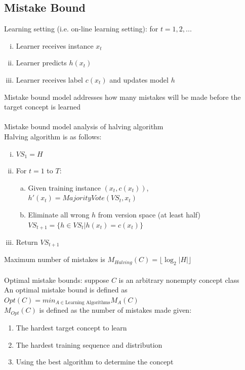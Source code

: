 \documentclass{article}
\begin{document}
		\subsection{Mistake Bound}
			Learning setting (i.e. on-line learning setting): for $t = 1, 2, ...$
			\begin{enumerate}[(i)]
				\item Learner receives instance $x_t$
				\item Learner predicts $h(x_t)$
				\item Learner receives label $c(x_t)$ and updates model $h$
				\end{enumerate}
			Mistake bound model addresses how many mistakes will be made before the target concept is learned \\
			\\
			Mistake bound model analysis of halving algorithm \\
			Halving algorithm is as follows:
			\begin{enumerate}[(i)]
				\item $VS_1 = H$
				\item For $t = 1$ to $T$:
				\begin{enumerate}[(a)]
					\item Given training instance $(x_t, c(x_t))$, $h'(x_t) = MajorityVote(VS_t, x_t)$
					\item Eliminate all wrong $h$ from version space (at least half) \\
					$VS_{t + 1} = \{h \in VS_t | h(x_t) = c(x_t)\}$
					\end{enumerate}
				\item Return $VS_{t + 1}$
				\end{enumerate}
			Maximum number of mistakes is $M_{Halving}(C) = \lfloor\log_2|H|\rfloor$ \\
			\\
			Optimal mistake bounds: suppose $C$ is an arbitrary nonempty concept class \\
			An optimal mistake bound is defined as $Opt(C) = min_{A \in \text{Learning Algorithms}} M_A(C)$ \\
			$M_{Opt}(C)$ is defined as the number of mistakes made given:
			\begin{enumerate}
			 	\item The hardest target concept to learn
			 	\item The hardest training sequence and distribution
			 	\item Using the best algorithm to determine the concept
				\end{enumerate} 
\end{document}
